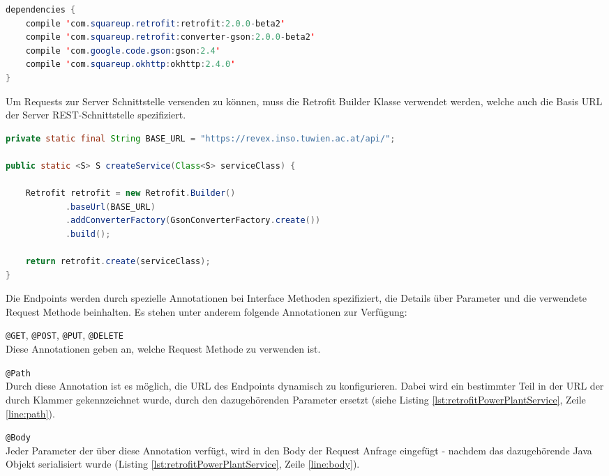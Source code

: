 \begin{lstlisting}[language=java, caption={app\textbackslash build.gradle},label=dependenciesRetrofit]
dependencies {
	compile 'com.squareup.retrofit:retrofit:2.0.0-beta2'
	compile 'com.squareup.retrofit:converter-gson:2.0.0-beta2'
	compile 'com.google.code.gson:gson:2.4'
	compile 'com.squareup.okhttp:okhttp:2.4.0'
}
\end{lstlisting}

Um Requests zur Server Schnittstelle versenden zu können, muss die Retrofit Builder Klasse verwendet werden, welche auch die Basis URL der Server REST-Schnittstelle spezifiziert.

\begin{lstlisting}[language=java, caption={Retrofit Builder},label=retrofitBuilder]
private static final String BASE_URL = "https://revex.inso.tuwien.ac.at/api/";
 
public static <S> S createService(Class<S> serviceClass) {

	Retrofit retrofit = new Retrofit.Builder()
			.baseUrl(BASE_URL)
			.addConverterFactory(GsonConverterFactory.create())
			.build();
	
	return retrofit.create(serviceClass);
}
\end{lstlisting}

Die Endpoints werden durch spezielle Annotationen bei Interface Methoden spezifiziert, die Details über Parameter und die verwendete Request Methode beinhalten. Es stehen unter anderem folgende Annotationen zur Verfügung:

\begin{list}{-}{}
	\item \texttt{@GET}, \texttt{@POST}, \texttt{@PUT}, \texttt{@DELETE}\\
	Diese Annotationen geben an, welche Request Methode zu verwenden ist.
	\item \texttt{@Path} \\
	Durch diese Annotation ist es möglich, die URL des Endpoints dynamisch zu konfigurieren. Dabei wird ein bestimmter Teil in der URL der durch Klammer gekennzeichnet wurde, durch den dazugehörenden Parameter ersetzt (siehe Listing \ref{lst:retrofitPowerPlantService}, Zeile \ref{line:path}).
	\item \texttt{@Body} \\
	Jeder Parameter der über diese Annotation verfügt, wird in den Body der Request Anfrage eingefügt - nachdem das dazugehörende Java Objekt serialisiert wurde (Listing \ref{lst:retrofitPowerPlantService}, Zeile \ref{line:body}).
\end{list}

